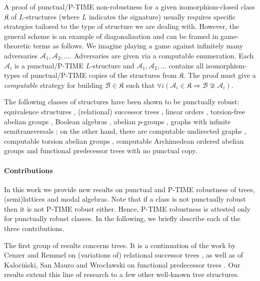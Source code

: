 \documentclass[a4paper,UKenglish,cleveref, autoref, thm-restate]{lipics-v2021}
\begin{document}
A proof of punctual/P-TIME non-robustness for a given isomorphism-closed class $\mathfrak K$ of $L$-structures (where $L$ indicates the signature) usually requires specific strategies tailored to the type of structure we are dealing with. However, the general scheme is an example of diagonalization and can be framed in game-theoretic terms as follows. We imagine playing a game against infinitely many adversaries $\mathcal A_1, \mathcal A_2, \dots$. Adversaries are given via a computable enumeration. Each $\mathcal A_i$ is a punctual/P-TIME $L$-structure and $\mathcal A_1, \mathcal A_2,\dots$ contains all isomorphism-types of punctual/P-TIME copies of the structures from $\mathfrak K$. The proof must give a \emph{computable} strategy for building $\mathcal B \in \mathfrak K$ such that $\forall i (\mathcal A_i \in \mathfrak K \Rightarrow \mathcal B \not\cong \mathcal A_i)$.


 The following classes of structures have been shown to be punctually robust: equivalence structures \cite{cenzer_polynomial_1991,kalimullin_algebraic_2017}, (relational) successor trees \cite{cenzer_feasible_1998}, linear orders \cite{grigorieff_every_1990,kalimullin_algebraic_2017}, torsion-free abelian groups \cite{kalimullin_algebraic_2017}, Boolean algebras \cite{kalimullin_algebraic_2017}, abelian $p$-groups \cite{kalimullin_algebraic_2017}, graphs with infinite semitransversals \cite{kalocinski_punctual_2024}; on the other hand, there are computable undirected graphs \cite{kalimullin_algebraic_2017}, computable torsion abelian groups \cite{cenzer_polynomial-time_1992}, computable Archimedean ordered abelian groups \cite{kalimullin_algebraic_2017} and functional predecessor trees \cite{kalocinski_punctual_2024} with no punctual copy.


\paragraph*{Contributions}In this work we provide new results on punctual and P-TIME robustness of trees, (semi)lattices and modal algebras. Note that if a class is not punctually robust then it is not P-TIME robust either. Hence, P-TIME robustness is attested only for punctually robust classes. In the following, we briefly describe each of the three contributions.

 The first group of results concerns trees. It is a continuation of the work by Cenzer and Remmel on (variations of) relational successor trees \cite{cenzer_feasible_1998}, as well as of Kalociński, San Mauro and Wrocławski on functional predecessor trees \cite{kalocinski_punctual_2024}. Our results extend this line of research to a few other well-known tree structures. 
\end{document}
